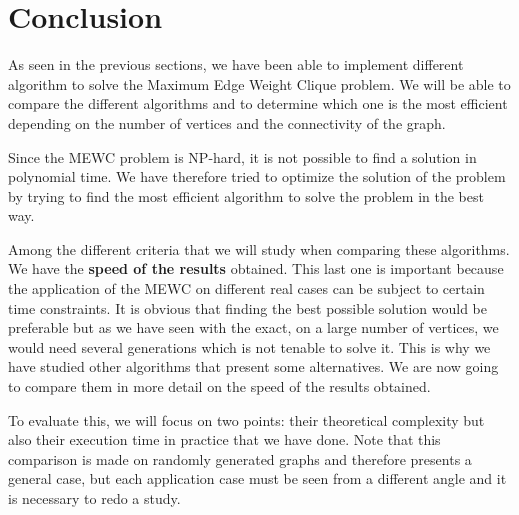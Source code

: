 
\section{Conclusion}

As seen in the previous sections, we have been able to implement different
algorithm to solve the Maximum Edge Weight Clique problem. We will be able to
compare the different algorithms and to determine which one is the most
efficient depending on the number of vertices and the connectivity of the graph.
\bigskip

Since the MEWC problem is NP-hard, it is not possible to find a solution in
polynomial time. We have therefore tried to optimize the solution of the problem
by trying to find the most efficient algorithm to solve the problem in the best
way.
\bigskip

Among the different criteria that we will study when comparing these algorithms. We have the \textbf{speed of the results} obtained. This last one is important because the application of the MEWC on different real cases can be subject to certain time constraints. It is obvious that finding the best possible solution would be preferable but as we have seen with the exact, on a large number of vertices, we would need several generations which is not tenable to solve it. This is why we have studied other algorithms that present some alternatives. We are now going to compare them in more detail on the speed of the results obtained. \bigskip

To evaluate this, we will focus on two points: their theoretical complexity but also their execution time in practice that we have done. Note that this comparison is made on randomly generated graphs and therefore presents a general case, but each application case must be seen from a different angle and it is necessary to redo a study. \bigskip

